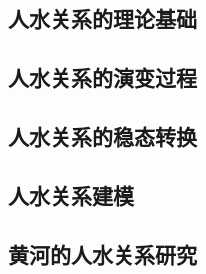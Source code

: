 \subsection{人\textendash{}水关系的理论基础}\label{ch1:sec:theories}


\subsection{人\textendash{}水关系的演变过程}\label{ch1:sec:process}


\subsection{人\textendash{}水关系的稳态转换}\label{ch1:sec:mechanism}


\subsection{人\textendash{}水关系建模}\label{ch1:sec:model}


\subsection{黄河的人\textendash{}水关系研究}\label{ch1:sec:yellow_river}
